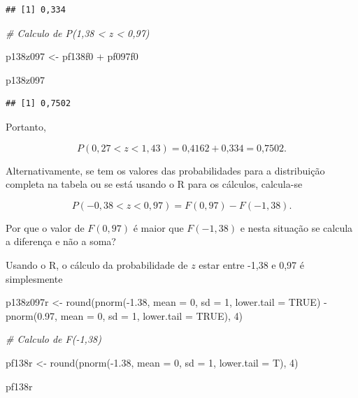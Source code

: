 \documentclass[
]{book}
\newenvironment{Shaded}{\begin{snugshade}}{\end{snugshade}}
\newcommand{\AttributeTok}[1]{\textcolor[rgb]{0.77,0.63,0.00}{#1}}
\newcommand{\CommentTok}[1]{\textcolor[rgb]{0.56,0.35,0.01}{\textit{#1}}}
\newcommand{\ConstantTok}[1]{\textcolor[rgb]{0.00,0.00,0.00}{#1}}
\newcommand{\DecValTok}[1]{\textcolor[rgb]{0.00,0.00,0.81}{#1}}
\newcommand{\FloatTok}[1]{\textcolor[rgb]{0.00,0.00,0.81}{#1}}
\newcommand{\FunctionTok}[1]{\textcolor[rgb]{0.00,0.00,0.00}{#1}}
\newcommand{\NormalTok}[1]{#1}
\newcommand{\OtherTok}[1]{\textcolor[rgb]{0.56,0.35,0.01}{#1}}
\newcommand{\SpecialCharTok}[1]{\textcolor[rgb]{0.00,0.00,0.00}{#1}}
\begin{document}
\begin{verbatim}
## [1] 0,334
\end{verbatim}

\begin{Shaded}
\begin{Highlighting}[]
\CommentTok{\# Calculo de P(1,38 \textless{} z \textless{} 0,97)}

\NormalTok{p138z097 }\OtherTok{\textless{}{-}}\NormalTok{ pf138f0 }\SpecialCharTok{+}\NormalTok{ pf097f0}

\NormalTok{p138z097}
\end{Highlighting}
\end{Shaded}

\begin{verbatim}
## [1] 0,7502
\end{verbatim}

Portanto,

\[
  P(0,27 < z < 1,43) = \text{0,4162} + \text{0,334} = \text{0,7502}.
\]

Alternativamente, se tem os valores das probabilidades para a distribuição completa na tabela ou se está usando o R para os cálculos, calcula-se

\[
  P(-0,38 < z < 0,97) = F(0,97) - F(-1,38).
\]

Por que o valor de \(F(0,97)\) é maior que \(F(-1,38)\) e nesta situação se calcula a diferença e não a soma?

Usando o R, o cálculo da probabilidade de \(z\) estar entre -1,38 e 0,97 é simplesmente

\begin{Shaded}
\begin{Highlighting}[]
\NormalTok{p138z097r }\OtherTok{\textless{}{-}} \FunctionTok{round}\NormalTok{(}\FunctionTok{pnorm}\NormalTok{(}\SpecialCharTok{{-}}\FloatTok{1.38}\NormalTok{, }\AttributeTok{mean =} \DecValTok{0}\NormalTok{, }\AttributeTok{sd =} \DecValTok{1}\NormalTok{, }\AttributeTok{lower.tail =} \ConstantTok{TRUE}\NormalTok{) }\SpecialCharTok{{-}} 
    \FunctionTok{pnorm}\NormalTok{(}\FloatTok{0.97}\NormalTok{, }\AttributeTok{mean =} \DecValTok{0}\NormalTok{, }\AttributeTok{sd =} \DecValTok{1}\NormalTok{, }\AttributeTok{lower.tail =} \ConstantTok{TRUE}\NormalTok{), }
    \DecValTok{4}\NormalTok{)}

\CommentTok{\# Calculo de F({-}1,38)}

\NormalTok{pf138r }\OtherTok{\textless{}{-}} \FunctionTok{round}\NormalTok{(}\FunctionTok{pnorm}\NormalTok{(}\SpecialCharTok{{-}}\FloatTok{1.38}\NormalTok{, }\AttributeTok{mean =} \DecValTok{0}\NormalTok{, }\AttributeTok{sd =} \DecValTok{1}\NormalTok{, }\AttributeTok{lower.tail =}\NormalTok{ T), }
    \DecValTok{4}\NormalTok{)}

\NormalTok{pf138r}
\end{Highlighting}
\end{Shaded}
\end{document}
